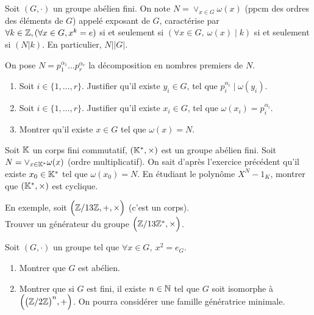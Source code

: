 \begin{exercise}
	Soit $(G,\cdot)$ un groupe abélien fini. On note $N=\vee_{x\in G}\omega(x)$
	(ppcm des ordres des éléments de $G$) appelé exposant de $G$, caractérise par
	$\forall k\in\mathbb{Z}, (\forall x\in G,x^{k}=e)$ si et seulement si $(\forall x\in
	G,~\omega(x)\mid k)$ si et seulement si $(N\vert k)$. En particulier,
	$N\mid\vert G\vert$.

	On pose $N=p_{1}^{\alpha_{1}}\dots p_{r}^{\alpha_{r}}$ la décomposition en
	nombres premiers de $N$.
	\begin{enumerate}
		\item
		Soit $i\in\{1,\dots,r\}$. Justifier qu'il existe $y_{i}\in G$, tel que
		$p_{i}^{\alpha_{i}}\mid \omega(y_{i})$.
		\item
		Soit $i\in\{1,\dots,r\}$. Justifier qu'il existe $x_{i}\in G$, tel que
		$\omega(x_{i})=p_{i}^{\alpha_{i}}$.
		\item
		Montrer qu'il existe $x\in G$ tel que $\omega(x)=N$.
	\end{enumerate}
\end{exercise}

\begin{exercise}
	Soit $\mathbb{K}$ un corps fini commutatif, $(\mathbb{K}^*,\times)$ est un groupe abélien
	fini. Soit $N=\vee_{x\in \mathbb{K}^*}\omega(x)$ (ordre multiplicatif). On sait
	d'après l'exercice précédent qu'il existe $x_{0}\in\mathbb{K}^*$ tel que
	$\omega(x_{0})=N$. En étudiant le polynôme $X^{N}-1_{K}$, montrer que
	$(\mathbb{K}^*,\times)$ est cyclique.
	
	En exemple, soit $\Bigl(\mathbb{Z}/13\mathbb{Z},+,\times\Bigr)$ (c'est un corps).\\
	Trouver un générateur du groupe $\Bigl(\mathbb{Z}/13\mathbb{Z}^*,\times\Bigr)$.
\end{exercise}

\begin{exercise}
	Soit $(G,\cdot)$ un groupe tel que $\forall x\in G,~x^2=e_{G}$.
	\begin{enumerate}
		\item
		Montrer que $G$ est abélien.
		\item
		Montrer que si $G$ est fini, il existe $n\in\mathbb{N}$ tel que $G$ soit isomorphe
		à $\Bigl(\bigl(\mathbb{Z}/2\mathbb{Z}\bigr)^n,+\Bigr)$. On pourra considérer une famille
		génératrice minimale.
	\end{enumerate}
\end{exercise}

